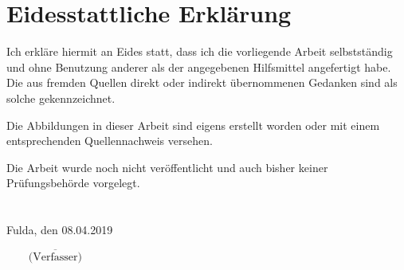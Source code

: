 \newpage
\chapter*{Eidesstattliche Erklärung}
\thispagestyle{empty}
Ich erkläre hiermit an Eides statt, dass ich die vorliegende Arbeit selbstständig und ohne Benutzung anderer als der angegebenen Hilfsmittel angefertigt habe.
Die aus fremden Quellen direkt oder indirekt übernommenen Gedanken sind als solche gekennzeichnet.

Die Abbildungen in dieser Arbeit sind eigens erstellt worden oder mit einem entsprechenden Quellennachweis versehen.

Die Arbeit wurde noch nicht veröffentlicht und auch bisher keiner Prüfungsbehörde vorgelegt.
\\\\\\
\noindent Fulda, den 08.04.2019
\begin{flushright}
$\overline{~~~~~~~~~\mbox{(Verfasser)}~~~~~~~~~}$
\end{flushright}
